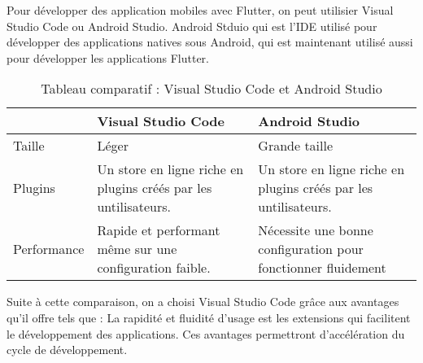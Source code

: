 Pour développer des application mobiles avec Flutter, on peut utilisier Visual Studio Code ou Android Studio. Android Stduio qui est l'IDE utilisé pour développer des applications natives sous Android, qui est maintenant utilisé aussi pour développer les applications Flutter.
\begin{table}[H]
    \begin{center}
        \begin{tabularx}{\textwidth} {
                | >{\centering\arraybackslash}X
                | >{\centering\arraybackslash}X
                | >{\centering\arraybackslash}X |}
            \hline
                        & Visual Studio Code                                              & Android Studio                                                  \\
            \hline
            Taille      & Léger                                                           & Grande taille                                                   \\
            \hline
            Plugins     & Un store en ligne riche en plugins créés par les untilisateurs. & Un store en ligne riche en plugins créés par les untilisateurs. \\
            \hline
            Performance & Rapide et performant même sur une configuration faible.         & Nécessite une bonne configuration pour fonctionner fluidement   \\
            \hline
        \end{tabularx}
        \captionsetup{justification = centering}
        \caption{Tableau comparatif : Visual Studio Code et Android Studio}
        \label{compare_vscode_android_studio}
    \end{center}
\end{table}
Suite à cette comparaison, on a choisi Visual Studio Code grâce aux avantages qu'il offre tels que : La rapidité et fluidité d'usage est les extensions qui facilitent le développement des applications. Ces avantages permettront d'accélération du cycle de développement.
